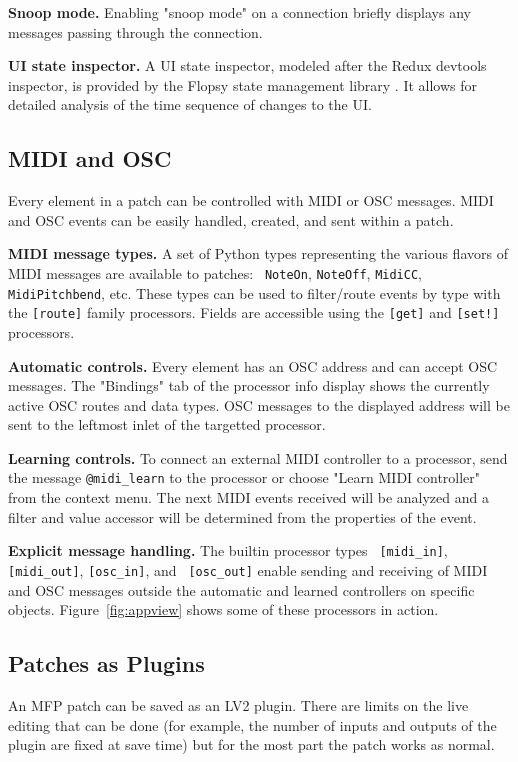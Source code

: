 \documentclass[a4paper]{article}
\begin{document}
{\bf Snoop mode.} Enabling "snoop mode" on a connection briefly
displays any messages passing through the connection.

{\bf UI state inspector.} A UI state inspector, modeled after the
Redux devtools inspector, is provided by the Flopsy state
management library \cite{Gribble:Flopsy}. It allows for detailed
analysis of the time sequence of changes to the UI.


\subsection{MIDI and OSC}

Every element in a patch can be controlled with MIDI or OSC
messages.  MIDI and OSC events can be easily handled, created,
and sent within a patch.

{\bf MIDI message types.} A set of Python types representing the
various flavors of MIDI messages are available to patches: {\tt
NoteOn}, {\tt NoteOff}, {\tt MidiCC}, {\tt MidiPitchbend}, etc.
These types can be used to filter/route events by type with the
{\tt [route]} family processors. Fields are accessible using the
{\tt [get]} and {\tt [set!]} processors.

{\bf Automatic controls.} Every element has an OSC address and
can accept OSC messages. The "Bindings" tab of the processor info
display shows the currently active OSC routes and data types. OSC
messages to the displayed address will be sent to the leftmost
inlet of the targetted processor.

{\bf Learning controls.} To connect an external MIDI controller to
a processor, send the message {\tt @midi\_learn} to the processor or
choose "Learn MIDI controller" from the context menu.
The next MIDI events received will be analyzed and a filter and
value accessor will be determined from the properties of the event.

{\bf Explicit message handling.} The builtin processor types {\tt
[midi\_in]}, {\tt [midi\_out]}, {\tt [osc\_in]}, and {\tt
[osc\_out]} enable sending and receiving of MIDI and OSC messages
outside the automatic and learned controllers on specific
objects. Figure~\ref{fig:appview} shows some of these processors
in action.


\subsection{Patches as Plugins}

An MFP patch can be saved as an LV2 plugin. There are limits on the
live editing that can be done (for example, the number of inputs and
outputs of the plugin are fixed at save time) but for the most part
the patch works as normal.
\end{document}
